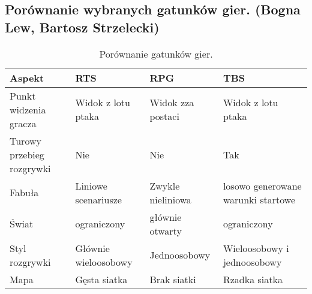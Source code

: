 \subsection{Porównanie wybranych gatunków gier. (Bogna Lew, Bartosz Strzelecki)}

\begin{table}[h]
\caption{Porównanie gatunków gier.}
\begin{center}
\begin{tabular}{| m{11em} | m{10em} | m{10em} | m{10em}|} 
 \hline
 Aspekt & RTS & RPG & TBS \\
 \hline \hline
 Punkt widzenia gracza & Widok z lotu ptaka & Widok zza postaci & Widok z lotu ptaka \\
 \hline
 Turowy przebieg rozgrywki & Nie & Nie & Tak \\
 \hline
 Fabuła & Liniowe scenariusze & Zwykle nieliniowa & losowo generowane warunki startowe \\
 \hline
 Świat & ograniczony & głównie otwarty & ograniczony \\
 \hline
 Styl rozgrywki & Głównie wieloosobowy & Jednoosobowy & Wieloosobowy i jednoosobowy \\
 \hline
 Mapa & Gęsta siatka & Brak siatki & Rzadka siatka \\
 \hline
\end{tabular}
\end{center}
\label{fig:teng} 
\end{table}
